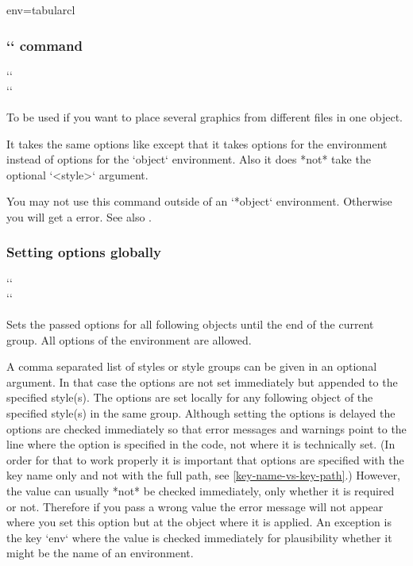 \begin{tableobject}{env=tabular}{cl}
\subsubsection{`` command}
\label{includegraphicsubobject-command}
`` \\
``

To be used if you want to place several graphics from different files in one object.

It takes the same options like  except that it takes options for the  environment instead of options for the `object` environment.
Also it does *not* take the optional `<style>` argument.

You may not use this command outside of an `*object` environment.
Otherwise you will get a  error.
See also .


\subsubsection{Setting options globally}
\label{setting-options-globally}

\DescribeMacro{\objectset}
`` \\
``

Sets the passed options for all following objects until the end of the current group.
All options of the  environment are allowed.

A comma separated list of styles or style groups can be given in an optional argument.
In that case the options are not set immediately but appended to the specified style(s).
The options are set locally for any following object of the specified style(s) in the same group.
Although setting the options is delayed the options are checked immediately so that error messages and warnings point to the line where the option is specified in the code, not where it is technically set.
(In order for that to work properly it is important that options are specified with the key name only and not with the full path, see \cref{key-name-vs-key-path}.)
However, the value can usually *not* be checked immediately, only whether it is required or not.
Therefore if you pass a wrong value the error message will not appear where you set this option but at the object where it is applied.
An exception is the key `env` where the value is checked immediately for plausibility whether it might be the name of an environment.


\end{tableobject}
